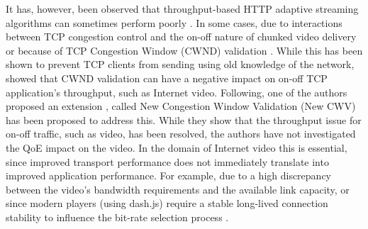 \documentclass[10pt,sigconf]{acmart}
\begin{document}
It has, however, been observed that throughput-based HTTP adaptive streaming algorithms can sometimes perform poorly \cite{Spiteri-2016-BOLA,Kua-2017-a-survey-rate-adaptation-dash}. In some cases, due to interactions between TCP congestion control and the on-off nature of chunked video delivery \cite{Akhshabi-2012-http-adaptive-players-compete,Stohr-2017-where-are-the-sweet-spots-maci} or because of TCP Congestion Window (CWND) validation \cite{rfc2861-2000-padhye-congestion-window-validation}. While this has been shown to prevent TCP clients from sending using old knowledge of the network, \cite{Nazir-2014-performance-evaluation-congestion-window-validation-dash-newcwv} showed that CWND validation can have a negative impact on on-off TCP application's throughput, such as Internet video. Following, one of the authors proposed an extension \cite{rfc7661-2015-fairhurst-new-cwnd-validation}, called New Congestion Window Validation (New CWV) has been proposed to address this. While they show that the throughput issue for on-off traffic, such as video, has been resolved, the authors have not investigated the QoE impact on the video. In the domain of Internet video this is essential, since improved transport performance does not immediately translate into improved application performance. For example, due to a high discrepancy between the video's bandwidth requirements and the available link capacity, or since modern players (using dash.js) require a stable long-lived connection stability to influence the bit-rate selection process \cite{Spiteri-2019-from-theory-to-practice-sabre}.



\end{document}

